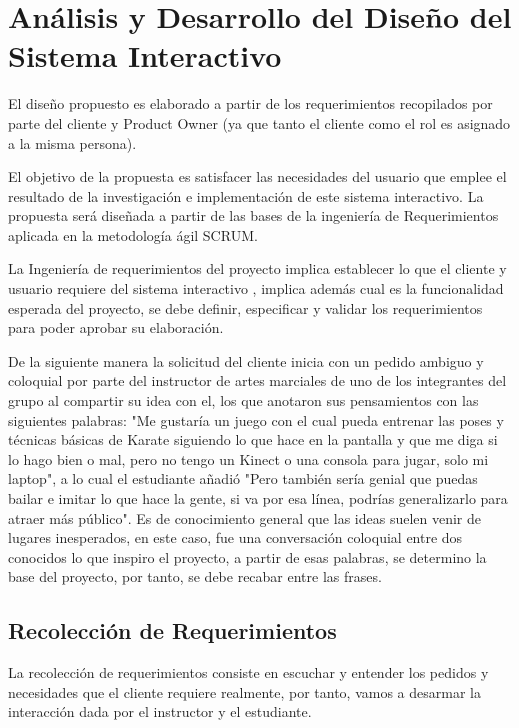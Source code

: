 \chapter{Análisis  y Desarrollo del Diseño del Sistema Interactivo}

El diseño propuesto es elaborado a partir de los requerimientos recopilados por parte del cliente y Product Owner (ya que tanto el cliente como el rol es asignado a la misma persona).

El objetivo de la propuesta es satisfacer las necesidades del usuario que emplee el resultado de la investigación e implementación de este sistema interactivo. La propuesta será diseñada a partir de las bases de la ingeniería de Requerimientos aplicada en la metodología ágil SCRUM.

La Ingeniería de requerimientos del proyecto implica establecer lo que el cliente y usuario requiere del sistema interactivo \cite{scrumdiapo}, implica además cual es la funcionalidad esperada del proyecto, se debe definir, especificar y validar los requerimientos para poder aprobar su elaboración.

De la siguiente manera la solicitud del cliente inicia con un pedido ambiguo y coloquial por parte del instructor de artes marciales de uno de los integrantes del grupo al compartir su idea con el, los que anotaron sus pensamientos con las siguientes palabras: "Me gustaría un juego con el cual pueda entrenar las poses y técnicas básicas de Karate siguiendo lo que hace en la pantalla y que me diga si lo hago bien o mal, pero no tengo un Kinect o una consola para jugar, solo mi laptop", a lo cual el estudiante añadió "Pero también sería genial que puedas bailar e imitar lo que hace la gente, si va por esa línea, podrías generalizarlo para atraer más público". Es de conocimiento general que las ideas suelen venir de lugares inesperados, en este caso, fue una conversación coloquial entre dos conocidos lo que inspiro el proyecto, a partir de esas palabras, se determino la base del proyecto, por tanto, se debe recabar entre las frases.

\section{Recolección de Requerimientos}

La recolección de requerimientos consiste en escuchar y entender los pedidos y necesidades que el cliente requiere realmente, por tanto, vamos a desarmar la interacción dada por el instructor y el estudiante.


